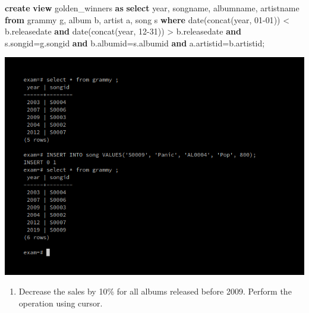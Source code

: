 \documentclass[
]{article}
\newenvironment{Shaded}{}{}
\newcommand{\DataTypeTok}[1]{\textcolor[rgb]{0.56,0.13,0.00}{#1}}
\newcommand{\FunctionTok}[1]{\textcolor[rgb]{0.02,0.16,0.49}{#1}}
\newcommand{\KeywordTok}[1]{\textcolor[rgb]{0.00,0.44,0.13}{\textbf{#1}}}
\newcommand{\NormalTok}[1]{#1}
\newcommand{\OperatorTok}[1]{\textcolor[rgb]{0.40,0.40,0.40}{#1}}
\newcommand{\StringTok}[1]{\textcolor[rgb]{0.25,0.44,0.63}{#1}}
\providecommand{\tightlist}{%
  \setlength{\itemsep}{0pt}\setlength{\parskip}{0pt}}
\begin{document}
\begin{Shaded}
\begin{Highlighting}[]
\KeywordTok{create} \KeywordTok{view}\NormalTok{ golden\_winners }\KeywordTok{as} 
   \KeywordTok{select} \DataTypeTok{year}\NormalTok{, songname, albumname, artistname }
      \KeywordTok{from}\NormalTok{ grammy g, album b, artist a, song s }
      \KeywordTok{where} \DataTypeTok{date}\NormalTok{(}\FunctionTok{concat}\NormalTok{(}\DataTypeTok{year}\NormalTok{, }\StringTok{\textquotesingle{}{-}01{-}01\textquotesingle{}}\NormalTok{)) }\OperatorTok{<}\NormalTok{ b.releasedate }
         \KeywordTok{and} \DataTypeTok{date}\NormalTok{(}\FunctionTok{concat}\NormalTok{(}\DataTypeTok{year}\NormalTok{, }\StringTok{\textquotesingle{}{-}12{-}31\textquotesingle{}}\NormalTok{)) }\OperatorTok{>}\NormalTok{ b.releasedate }
         \KeywordTok{and}\NormalTok{ s.songid}\OperatorTok{=}\NormalTok{g.songid }\KeywordTok{and}\NormalTok{ b.albumid}\OperatorTok{=}\NormalTok{s.albumid }
         \KeywordTok{and}\NormalTok{ a.artistid}\OperatorTok{=}\NormalTok{b.artistid;}
\end{Highlighting}
\end{Shaded}

\includegraphics{../Images/Exam_Report/6.png}

\begin{enumerate}
\def\labelenumi{\arabic{enumi}.}
\setcounter{enumi}{7}
\tightlist
\item
  Decrease the sales by 10\% for all albums released before 2009.
  Perform the operation using cursor.
\end{enumerate}
\end{document}
